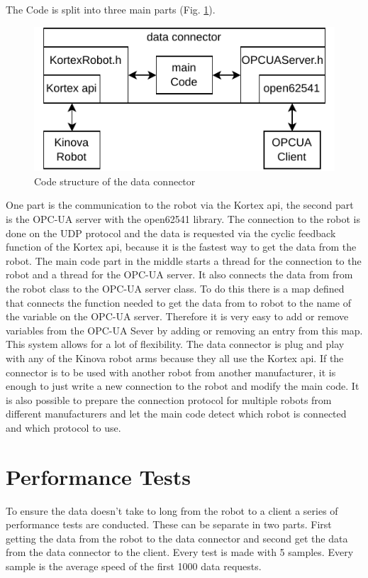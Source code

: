 \documentclass[conference]{IEEEtran}
\begin{document}
The Code is split into three main parts (Fig. \ref{fig:dataConectorStructure}).
\begin{figure}[htbp]
    \centerline{\includegraphics{Pictures/dataConectorStructure.pdf}}
    \caption{Code structure of the data connector}
    \label{fig:dataConectorStructure}
\end{figure}
One part is the communication to the robot via the Kortex api, the second part is the OPC-UA server with the open62541 library.
The connection to the robot is done on the UDP protocol and the data is requested via the cyclic feedback function of the Kortex api, because it is the fastest way to get the data from the robot.
The main code part in the middle  starts a thread for the connection to the robot and a thread for the OPC-UA server.
It also connects the data from from the robot class to the OPC-UA server class.
To do this there is a map defined that connects the function needed to get the data from to robot to the name of the variable on the OPC-UA server.
Therefore it is very easy to add or remove variables from the OPC-UA Sever by adding or removing an entry from this map.\\
This system allows for a lot of flexibility. The data connector is plug and play with any of the Kinova robot arms because they all use the Kortex api.
If the connector is to be used with another robot from another manufacturer, it is enough to just write a new connection to the robot and modify the main code.
It is also possible to prepare the connection protocol for multiple robots from different manufacturers and let the main code detect which robot is connected and which protocol to use.

\section{Performance Tests}
To ensure the data doesn't take to long from the robot to a client a series of performance tests are conducted.
These can be separate in two parts. 
First getting the data from the robot to the data connector and second get the data from the data connector to the client.
Every test is made with 5 samples. Every sample is the average speed of the first 1000 data requests.
\end{document}
